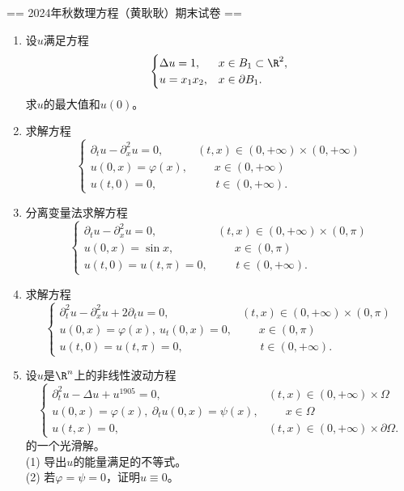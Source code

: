 == 2024年秋数理方程（黄耿耿）期末试卷 ==
\begin{enumerate}
    \item 设$u$满足方程
    \[\begin{cases}\Delta u=1,&x\in B_1\subset\R^2,\\
        u=x_1x_2,&x\in\partial B_1.
    \end{cases}\]
    求$u$的最大值和$u(0)$。
    \item 求解方程
    \[\begin{cases}
        \partial_tu-\partial_x^2u=0,&(t,x)\in(0,+\infty)\times(0,+\infty)\\
        u(0,x)=\varphi(x),&\quad\,\,\ x\in(0,+\infty)\\
        u(t,0)=0,&\quad\ \ \ t\in(0,+\infty).
    \end{cases}\]
    \item 分离变量法求解方程
    \[\begin{cases}
        \partial_tu-\partial_x^2u=0,&(t,x)\in(0,+\infty)\times(0,\pi)\\
        u(0,x)=\sin x,&\quad\,\,\ x\in(0,\pi)\\
        u(t,0)=u(t,\pi)=0,&\quad\ \ \ t\in(0,+\infty).
    \end{cases}\]
    \item 求解方程
    \[\begin{cases}
        \partial_t^2u-\partial_x^2u+2\partial_tu=0,&(t,x)\in(0,+\infty)\times(0,\pi)\\
        u(0,x)=\varphi(x),\ u_t(0,x)=0,&\quad\,\,\ x\in(0,\pi)\\
        u(t,0)=u(t,\pi)=0,&\quad\ \ \ t\in(0,+\infty).
    \end{cases}\]
    \item 设$u$是$\R^n$上的非线性波动方程
    \[\begin{cases}
        \partial_t^2u-\Delta u+u^{1905}=0,&(t,x)\in(0,+\infty)\times\Omega\\
        u(0,x)=\varphi(x),\ \partial_tu(0,x)=\psi(x),&\quad\,\,\ x\in\Omega\\
        u(t,x)=0,&(t,x)\in(0,+\infty)\times\partial\Omega.
    \end{cases}\]
    的一个光滑解。\\
    (1) 导出$u$的能量满足的不等式。\\
    (2) 若$\varphi=\psi=0$，证明$u\equiv0$。


\end{enumerate}
